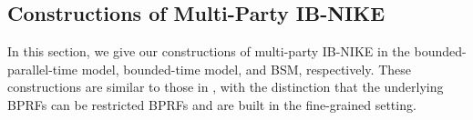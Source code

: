 \subsection{Constructions of Multi-Party IB-NIKE}
\label{sec:bprf-ibnike}
In this section, we give our constructions of multi-party IB-NIKE in the bounded-parallel-time model, bounded-time model, and BSM, respectively. These constructions are similar to those in \cite{HKKW13}, with the distinction that the underlying BPRFs can be restricted BPRFs and are built in the fine-grained setting.

